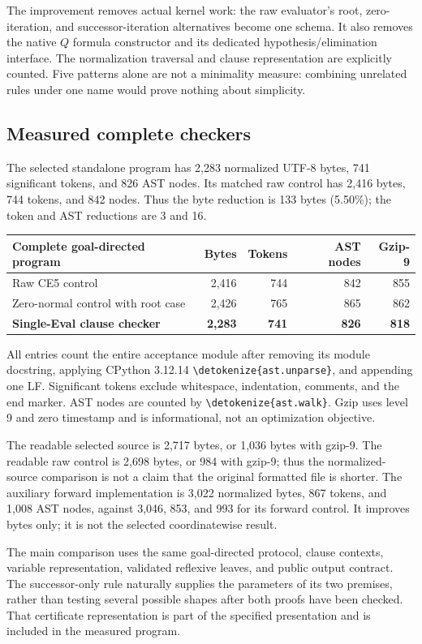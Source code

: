 \documentclass[11pt]{article}
\theoremstyle{definition}
\newcommand{\file}[1]{\expandafter\nolinkurl\expandafter{\detokenize{#1}}}
\begin{document}
The improvement removes actual kernel work: the raw evaluator's root,
zero-iteration, and successor-iteration alternatives become one schema.
It also removes the native $Q$ formula constructor and its dedicated
hypothesis/elimination interface. The normalization traversal and clause
representation are explicitly counted. Five patterns alone are not a
minimality measure: combining unrelated rules under one name would prove
nothing about simplicity.

\subsection{Measured complete checkers}

The selected standalone program has 2,283 normalized UTF-8 bytes,
741 significant tokens, and 826 AST nodes. Its matched raw control has
2,416 bytes, 744 tokens, and 842 nodes. Thus the byte reduction is
133 bytes (5.50\%); the token and AST reductions are 3 and 16.
\begin{center}
\begin{tabular}{@{}lrrrr@{}}
\toprule
Complete goal-directed program & Bytes & Tokens & AST nodes & Gzip-9\\
\midrule
Raw CE5 control & 2,416 & 744 & 842 & 855\\
Zero-normal control with root case & 2,426 & 765 & 865 & 862\\
\textbf{Single-Eval clause checker} & \textbf{2,283} & \textbf{741} & \textbf{826} & \textbf{818}\\
\bottomrule
\end{tabular}
\end{center}
All entries count the entire acceptance module after removing its module
docstring, applying CPython 3.12.14 \file{ast.unparse}, and appending one LF.
Significant tokens exclude whitespace, indentation, comments, and the end
marker. AST nodes are counted by \file{ast.walk}. Gzip uses level 9 and
zero timestamp and is informational, not an optimization objective.

The readable selected source is 2,717 bytes, or 1,036 bytes with gzip-9.
The readable raw control is 2,698 bytes, or 984 with gzip-9; thus the
normalized-source comparison is not a claim that the original formatted
file is shorter. The auxiliary forward implementation is 3,022 normalized
bytes, 867 tokens, and 1,008 AST nodes, against 3,046, 853, and 993 for
its forward control. It improves bytes only; it is not the selected
coordinatewise result.

The main comparison uses the same goal-directed protocol, clause contexts,
variable representation, validated reflexive leaves, and public output
contract. The successor-only rule naturally supplies the parameters of its
two premises, rather than testing several possible shapes after both proofs
have been checked. That certificate representation is part of the specified
presentation and is included in the measured program.
\end{document}
